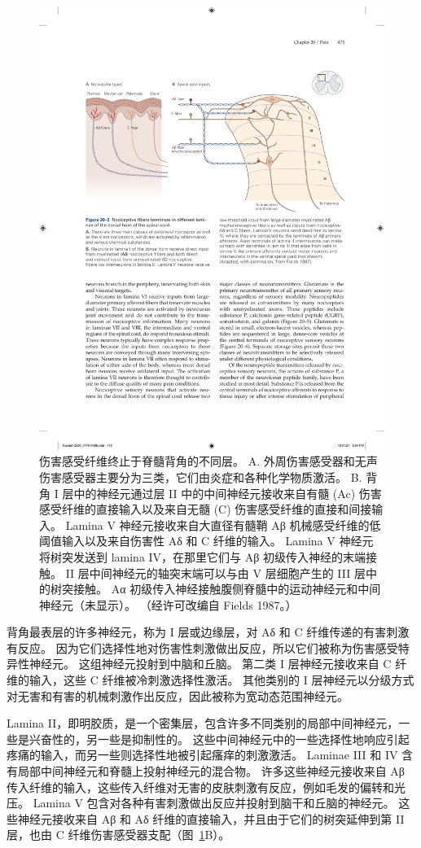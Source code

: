 \begin{figure}[htbp]
	\centering
	\includegraphics[width=0.7\linewidth]{chap20/fig_20_3}
	\caption{伤害感受纤维终止于脊髓背角的不同层。
		A. 外周伤害感受器和无声伤害感受器主要分为三类，它们由炎症和各种化学物质激活。
		B. 背角 I 层中的神经元通过层 II 中的中间神经元接收来自有髓 (Ac) 伤害感受纤维的直接输入以及来自无髓 (C) 伤害感受纤维的直接和间接输入。
		Lamina V 神经元接收来自大直径有髓鞘 Aβ 机械感受纤维的低阈值输入以及来自伤害性 Aδ 和 C 纤维的输入。
		Lamina V 神经元将树突发送到 lamina IV，在那里它们与 Aβ 初级传入神经的末端接触。
		II 层中间神经元的轴突末端可以与由 V 层细胞产生的 III 层中的树突接触。
		Aα 初级传入神经接触腹侧脊髓中的运动神经元和中间神经元（未显示）。 （经许可改编自 Fields 1987。）}
	\label{fig:20_3}
\end{figure}


背角最表层的许多神经元，称为 I 层或边缘层，对 Aδ 和 C 纤维传递的有害刺激有反应。
因为它们选择性地对伤害性刺激做出反应，所以它们被称为伤害感受特异性神经元。
这组神经元投射到中脑和丘脑。
第二类 I 层神经元接收来自 C 纤维的输入，这些 C 纤维被冷刺激选择性激活。
其他类别的 I 层神经元以分级方式对无害和有害的机械刺激作出反应，因此被称为宽动态范围神经元。


Lamina II，即明胶质，是一个密集层，包含许多不同类别的局部中间神经元，一些是兴奋性的，另一些是抑制性的。
这些中间神经元中的一些选择性地响应引起疼痛的输入，而另一些则选择性地被引起瘙痒的刺激激活。
Laminae III 和 IV 含有局部中间神经元和脊髓上投射神经元的混合物。
许多这些神经元接收来自 Aβ 传入纤维的输入，这些传入纤维对无害的皮肤刺激有反应，例如毛发的偏转和光压。
Lamina V 包含对各种有害刺激做出反应并投射到脑干和丘脑的神经元。
这些神经元接收来自 Aβ 和 Aδ 纤维的直接输入，并且由于它们的树突延伸到第 II 层，也由 C 纤维伤害感受器支配（图~\ref{fig:20_3}B）。


